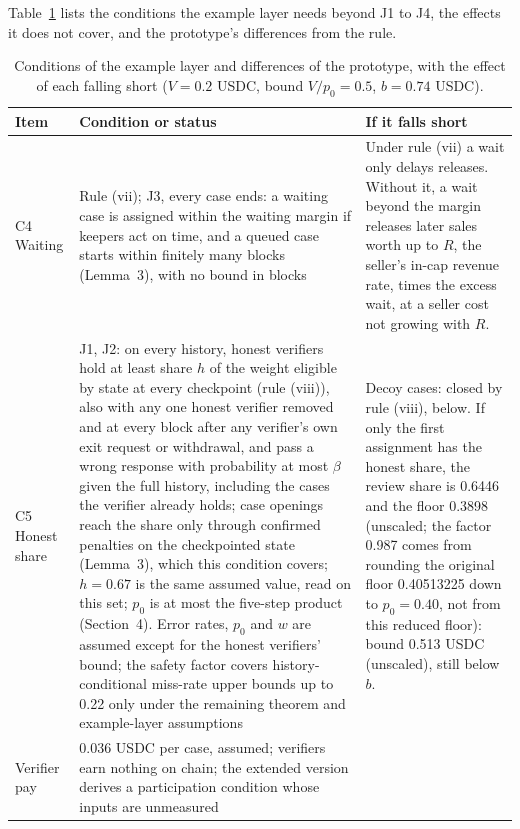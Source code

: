 \documentclass[10pt,a4paper]{article}
\newcommand{\vmax}{V}
\theoremstyle{plain}
\theoremstyle{remark}
\begin{document}
Table~\ref{atab:example} lists the conditions the example layer needs beyond J1 to J4, the effects it does not cover, and the prototype's differences from the rule.
\begin{table}[t]
\centering
\caption{Conditions of the example layer and differences of the prototype, with the effect of each falling short ($\vmax=0.2$ USDC, bound $\vmax/p_0 = 0.5$, $b=0.74$ USDC).}
\label{atab:example}
\scriptsize
\setlength{\tabcolsep}{4pt}\renewcommand{\arraystretch}{0.9}
\begin{tabular}{@{}>{\raggedright}p{1.94cm}>{\raggedright}p{6.07cm}>{\raggedright\arraybackslash}p{7.13cm}@{}}
\toprule
Item & Condition or status & If it falls short \\
\midrule
C4 Waiting & Rule (vii); J3, every case ends: a waiting case is assigned within the waiting margin if keepers act on time, and a queued case starts within finitely many blocks (Lemma~3), with no bound in blocks & Under rule (vii) a wait only delays releases. Without it, a wait beyond the margin releases later sales worth up to $R$, the seller's in-cap revenue rate, times the excess wait, at a seller cost not growing with $R$. \\
C5 Honest share & J1, J2: on every history, honest verifiers hold at least share $h$ of the weight eligible by state at every checkpoint (rule (viii)), also with any one honest verifier removed and at every block after any verifier's own exit request or withdrawal, and pass a wrong response with probability at most $\beta$ given the full history, including the cases the verifier already holds; case openings reach the share only through confirmed penalties on the checkpointed state (Lemma~3), which this condition covers; $h=0.67$ is the same assumed value, read on this set; $p_0$ is at most the five-step product (Section~4). Error rates, $p_0$ and $w$ are assumed except for the honest verifiers' bound; the safety factor covers history-conditional miss-rate upper bounds up to 0.22 only under the remaining theorem and example-layer assumptions & Decoy cases: closed by rule (viii), below. If only the first assignment has the honest share, the review share is 0.6446 and the floor 0.3898 (unscaled; the factor 0.987 comes from rounding the original floor 0.40513225 down to $p_0=0.40$, not from this reduced floor): bound 0.513 USDC (unscaled), still below $b$. \\
Verifier pay & 0.036 USDC per case, assumed; verifiers earn nothing on chain; the extended version derives a participation condition whose inputs are unmeasured & \\

\end{tabular}
\end{table}
\end{document}

